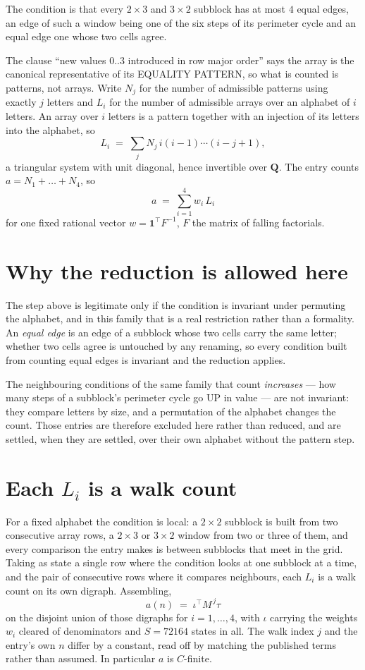 \documentclass[11pt,a4paper]{article}
\theoremstyle{plain}
\theoremstyle{definition}
\begin{document}
The condition is that every $2\times3$ and $3\times2$ subblock has at most $4$ equal edges, an edge of such a window being one of the six steps of its perimeter cycle and an equal edge one whose two cells agree.

The clause ``new values $0..3$ introduced in row major order'' says the array is the
canonical representative of its EQUALITY PATTERN, so what is counted is patterns, not arrays.
Write $N_j$ for the number of admissible patterns using exactly $j$ letters and $L_i$ for the
number of admissible arrays over an alphabet of $i$ letters. An array over $i$ letters is a
pattern together with an injection of its letters into the alphabet, so
\[
L_i\;=\;\sum_j N_j\,i(i-1)\cdots(i-j+1),
\]
a triangular system with unit diagonal, hence invertible over $\mathbf{Q}$. The entry counts
$a=N_1+\dots+N_{4}$, so
\[
a\;=\;\sum_{i=1}^{4}w_i\,L_i
\]
for one fixed rational vector $w=\mathbf{1}^{\!\top}F^{-1}$, $F$ the matrix of falling
factorials.

\section{Why the reduction is allowed here}

The step above is legitimate only if the condition is invariant under permuting the alphabet,
and in this family that is a real restriction rather than a formality. An \emph{equal edge}
is an edge of a subblock whose two cells carry the same letter; whether two cells agree is
untouched by any renaming, so every condition built from counting equal edges is invariant and
the reduction applies.

The neighbouring conditions of the same family that count \emph{increases} --- how many steps
of a subblock's perimeter cycle go UP in value --- are not invariant: they compare letters by
size, and a permutation of the alphabet changes the count. Those entries are therefore excluded
here rather than reduced, and are settled, when they are settled, over their own alphabet
without the pattern step.

\section{Each $L_i$ is a walk count}

For a fixed alphabet the condition is local: a $2\times2$ subblock is built from two
consecutive array rows, a $2\times3$ or $3\times2$ window from two or three of them, and every
comparison the entry makes is between subblocks that meet in the grid. Taking as state a single
row where the condition looks at one subblock at a time, and the pair of consecutive rows where
it compares neighbours, each $L_i$ is a walk count on its own digraph. Assembling,
\[
a(n)\;=\;\iota^{\!\top}M^{\,j}\tau
\]
on the disjoint union of those digraphs for $i=1,\dots,4$, with $\iota$ carrying the weights
$w_i$ cleared of denominators and $S=72164$ states in all. The walk index $j$ and the entry's own
$n$ differ by a constant, read off by matching the published terms rather than assumed. In
particular $a$ is $C$-finite.
\end{document}
